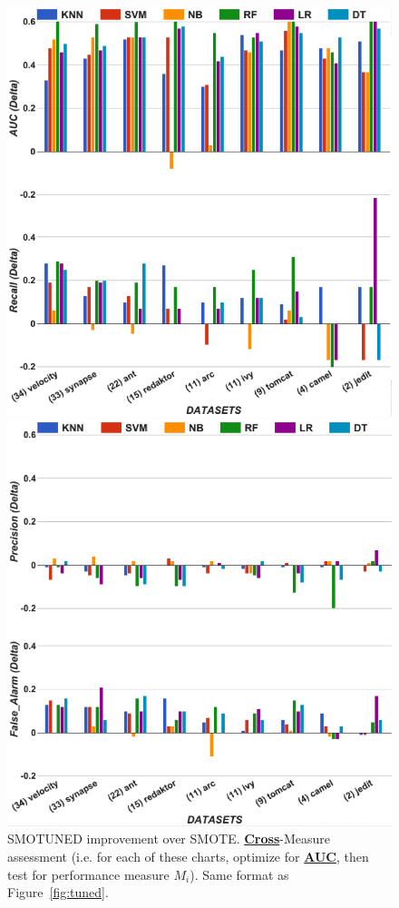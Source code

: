 \documentclass[10pt,conference]{IEEEtran}
\theoremstyle{break}
\theoremstyle{break}
\begin{document}
\begin{figure}[!htbp]
\begin{minipage}{.5\linewidth}
\centering
        \includegraphics[width=.95\linewidth]{./fig/AUC_auc1.png}
    \end{minipage}%
\begin{minipage}{.5\linewidth}
        \centering
        \includegraphics[width=.95\linewidth]{./fig/AUC_prec.png}
    \end{minipage}%
    
    \caption{ SMOTUNED improvement over SMOTE. 
    \underline{{\bf Cross}}-Measure
    assessment (i.e. for each of these charts,
    optimize for \underline{{\bf AUC}}, then test for
    performance measure $M_i$).  Same format as
    Figure~\ref{fig:tuned}.}
    \label{fig:auc22}
\vspace{-0.6cm}
\end{figure} 
\end{document}
